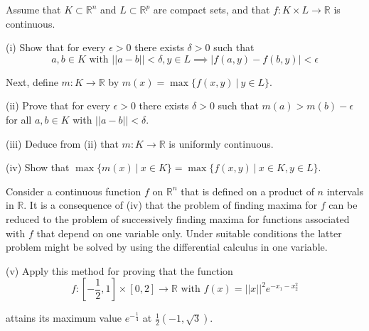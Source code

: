 \begin{exercise}{35}
    Assume that $K \subset \mathbb{R}^n$ and $L \subset \mathbb{R}^p$ are compact sets, and that $f: K \times L \rightarrow \mathbb{R}$ is continuous.

    (i) Show that for every $\epsilon > 0$ there exists $\delta > 0$ such that
    $$a, b \in K \text{ with } \lvert \lvert a - b \rvert \rvert < \delta, y \in L \implies \lvert f(a, y) - f(b, y) \rvert < \epsilon$$

    Next, define $m: K \rightarrow \mathbb{R}$ by $m(x) = \max\{f(x, y) \ \rvert \ y \in L\}$.

    (ii) Prove that for every $\epsilon > 0$ there exists $\delta > 0$ such that $m(a) > m(b) - \epsilon$ for all $a, b \in K$ with $\lvert \lvert a - b \rvert \rvert < \delta$.

    (iii) Deduce from (ii) that $m: K \rightarrow \mathbb{R}$ is uniformly continuous.

    (iv) Show that $\max\{m(x) \ \rvert \ x \in K\} = \max\{f(x, y) \ \rvert \ x \in K, y \in L\}$.

    Consider a continuous function $f$ on $\mathbb{R}^n$ that is defined on a product of $n$ intervals in $\mathbb{R}$. It is a consequence of (iv) that the problem of finding maxima for $f$ can be reduced to the problem of successively finding maxima for functions associated with $f$ that depend on one variable only. Under suitable conditions the latter problem might be solved by using the differential calculus in one variable. 

    (v) Apply this method for proving that the function 
    $$f: [-\frac{1}{2}, 1] \times [0, 2] \rightarrow \mathbb{R} \text{ with } f(x) = \lvert \lvert x \rvert \rvert^2e^{-x_1 - x_2^2}$$

     attains its maximum value $e^{-\frac{1}{4}}$ at $\frac{1}{2}(-1, \sqrt{3})$.
\end{exercise}

